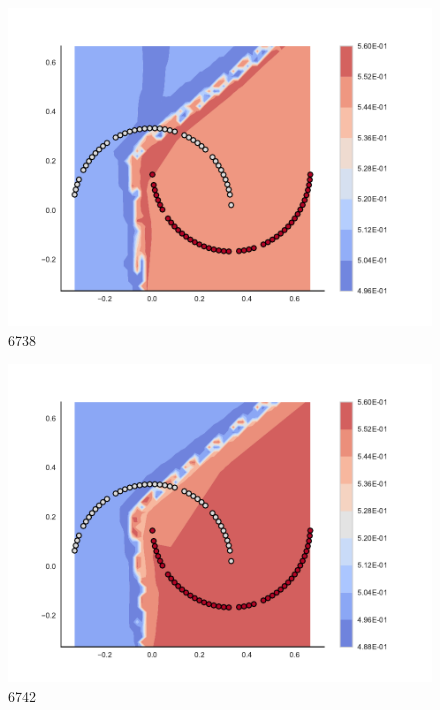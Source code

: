 \begin{subfigure}[b]{0.09\textwidth}
    \includegraphics[clip, trim=2.35cm 1.75cm 4.5cm 0cm,width=\textwidth]{img/convergence/6738.pdf}
    \caption{6738}
    \label{fig:convergence_6738}
\end{subfigure}
%
\begin{subfigure}[b]{0.09\textwidth}
    \includegraphics[clip, trim=2.35cm 1.75cm 4.5cm 0cm,width=\textwidth]{img/convergence/6742.pdf}
    \caption{6742}
    \label{fig:convergence_6742}
\end{subfigure}
%
